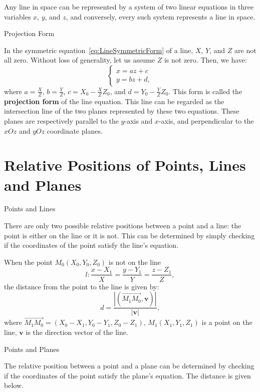 \documentclass[11pt]{../../TexTemplate/elegantbook} %
\begin{document}
\begin{theorem}
    Any line in space can be represented by a system of two linear equations in three variables \(x\), \(y\), and \(z\),
    and conversely, every such system represents a line in space.
    
\end{theorem}

\begin{leftbarTitle}{Projection Form}\end{leftbarTitle}
In the symmetric equation~\ref{eq:LineSymmetricForm} of a line,
\(X\), \(Y\), and \(Z\) are not all zero. 
Without loss of generality, let us assume \(Z\) is not zero. 
Then, we have:
\[
\begin{cases}
    x = az + c \\
    y = bz + d,
\end{cases}
\]
where \(a = \frac{X}{Z}\), \(b = \frac{Y}{Z}\), \(c = X_{0} - \frac{X}{Z}Z_{0}\), and \(d = Y_{0} - \frac{Y}{Z}Z_{0}\).
This form is called the \textbf{projection form} of the line equation.
This line can be regarded as the intersection line of the two planes represented by these two equations. 
These planes are respectively parallel to the \(y\)-axis and \(x\)-axis, 
and perpendicular to the \(xOz\) and \(yOz\) coordinate planes.


\section{Relative Positions of Points, Lines and Planes}
\begin{leftbarTitle}{Points and Lines}\end{leftbarTitle}
There are only two possible relative positions between a point and a line:
the point is either on the line or it is not.
This can be determined by simply checking if the coordinates of the point satisfy the line's equation.

When the point \(M_{0}(X_{0}, Y_{0}, Z_{0})\) is not on the line
\[
l: \frac{x - X_{1}}{X} = \frac{y - Y_{1}}{Y} = \frac{z - Z_{1}}{Z},
\]
the distance from the point to the line is given by:
\[
d = \frac{|(\vec{M_{1}M_{0}}, \mathbf{v})|}{|\mathbf{v}|},
\]
where \(\vec{M_{1}M_{0}} = (X_{0} - X_{1}, Y_{0} - Y_{1}, Z_{0} - Z_{1})\),
\(M_{1}(X_{1}, Y_{1}, Z_{1})\) is a point on the line,
\(\mathbf{v}\) is the direction vector of the line.



\begin{leftbarTitle}{Points and Planes}\end{leftbarTitle}
The relative position between a point and a plane 
can be determined by checking if the coordinates of the point satisfy the plane's equation.
The distance is given below.
\end{document}
